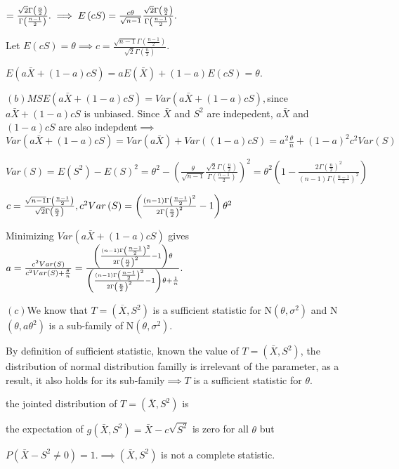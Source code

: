 \documentclass{article}
\begin{document}
$=\frac{\sqrt{2}\Gamma \left( \frac{n}{2}\right) }{\Gamma \left( \frac{n-1}{2%
}\right) }.\implies E\left( cS\right) =\frac{c\theta }{\sqrt{n-1}}\frac{%
\sqrt{2}\Gamma \left( \frac{n}{2}\right) }{\Gamma \left( \frac{n-1}{2}%
\right) }.$

Let $E\left( cS\right) =\theta \implies c=\frac{\sqrt{n-1}\Gamma \left( 
\frac{n-1}{2}\right) }{\sqrt{2}\Gamma \left( \frac{n}{2}\right) }.$

$E\left( a\bar{X}+\left( 1-a\right) cS\right) =aE\left( \bar{X}\right)
+\left( 1-a\right) E\left( cS\right) =\theta .$

$\left( b\right) MSE\left( a\bar{X}+\left( 1-a\right) cS\right) =Var\left( a%
\bar{X}+\left( 1-a\right) cS\right) ,$since $a\bar{X}+\left( 1-a\right) cS$
is unbiased. Since $\bar{X}$ and $S^{2}$ are indepedent, $a\bar{X}$ and $%
\left( 1-a\right) cS$ are also indepdent$\implies $ $Var\left( a\bar{X}%
+\left( 1-a\right) cS\right) =Var\left( a\bar{X}\right) +Var\left( \left(
1-a\right) cS\right) =a^{2}\frac{\theta }{n}+\left( 1-a\right)
^{2}c^{2}Var\left( S\right) $

$Var\left( S\right) =E\left( S^{2}\right) -E\left( S\right) ^{2}=\theta
^{2}-\left( \frac{\theta }{\sqrt{n-1}}\frac{\sqrt{2}\Gamma \left( \frac{n}{2}%
\right) }{\Gamma \left( \frac{n-1}{2}\right) }\right) ^{2}=\theta ^{2}\left(
1-\frac{2\Gamma \left( \frac{n}{2}\right) ^{2}}{\left( n-1\right) \Gamma
\left( \frac{n-1}{2}\right) ^{2}}\right) $

\bigskip $c=\frac{\sqrt{n-1}\Gamma \left( \frac{n-1}{2}\right) }{\sqrt{2}%
\Gamma \left( \frac{n}{2}\right) },c^{2}Var\left( S\right) =\left( \frac{%
\left( n-1\right) \Gamma \left( \frac{n-1}{2}\right) ^{2}}{2\Gamma \left( 
\frac{n}{2}\right) ^{2}}-1\right) \theta ^{2}$

Minimizing $Var\left( a\bar{X}+\left( 1-a\right) cS\right) $ gives $a=\frac{%
c^{2}Var\left( S\right) }{c^{2}Var\left( S\right) +\frac{\theta }{n}}=\frac{%
\left( \frac{\left( n-1\right) \Gamma \left( \frac{n-1}{2}\right) ^{2}}{%
2\Gamma \left( \frac{n}{2}\right) ^{2}}-1\right) \theta }{\left( \frac{%
\left( n-1\right) \Gamma \left( \frac{n-1}{2}\right) ^{2}}{2\Gamma \left( 
\frac{n}{2}\right) ^{2}}-1\right) \theta +\frac{1}{n}}.$

$\left( c\right) $We know that $T=\left( \overline{X},S^{2}\right) $ is a
sufficient statistic for N$\left( \theta ,\sigma ^{2}\right) $ and N$\left(
\theta ,a\theta ^{2}\right) $ is a sub-family of N$\left( \theta ,\sigma
^{2}\right) .$

By definition of sufficient statistic, known the value of $T=\left( \bar{X}%
,S^{2}\right) $, the distribution of normal distribution familly is
irrelevant of the parameter, as a result, it also holds for its sub-family$%
\implies T$ is a sufficient statistic for $\theta .$

\bigskip the jointed distribution of $T=\left( \bar{X},S^{2}\right) $ is

the expectation of $g\left( \bar{X},S^{2}\right) =\bar{X}-c\sqrt{S^{2}}$ is
zero for all $\theta $ but

$P\left( \bar{X}-S^{2}\neq 0\right) =1.\implies \left( \bar{X},S^{2}\right) $
is not a complete statistic.\qquad
\end{document}
